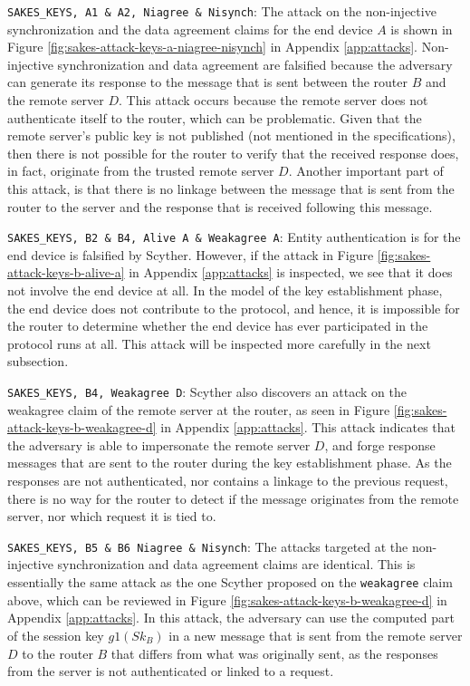 \begin{list}{•}{}


\item \texttt{SAKES\_KEYS, A1 \& A2, Niagree \& Nisynch}: The attack on the non-injective synchronization and the data agreement claims for the end device $A$ is shown in Figure \ref{fig:sakes-attack-keys-a-niagree-nisynch} in Appendix \ref{app:attacks}. Non-injective synchronization and data agreement are falsified because the adversary can generate its response to the message that is sent between the router $B$ and the remote server $D$. This attack occurs because the remote server does not authenticate itself to the router, which can be problematic. Given that the remote server's public key is not published (not mentioned in the specifications), then there is not possible for the router to verify that the received response does, in fact, originate from the trusted remote server $D$. Another important part of this attack, is that there is no linkage between the message that is sent from the router to the server and the response that is received following this message. 

\item \texttt{SAKES\_KEYS, B2 \& B4, Alive A \& Weakagree A}: Entity authentication is for the end device is falsified by Scyther. However, if the attack in Figure \ref{fig:sakes-attack-keys-b-alive-a} in Appendix \ref{app:attacks} is inspected, we see that it does not involve the end device at all. In the model of the key establishment phase, the end device does not contribute to the protocol, and hence, it is impossible for the router to determine whether the end device has ever participated in the protocol runs at all. This attack will be inspected more carefully in the next subsection.

\item \texttt{SAKES\_KEYS, B4, Weakagree D}: Scyther also discovers an attack on the weakagree claim of the remote server at the router, as seen in Figure \ref{fig:sakes-attack-keys-b-weakagree-d} in Appendix \ref{app:attacks}. This attack indicates that the adversary is able to impersonate the remote server $D$, and forge response messages that are sent to the router during the key establishment phase. As the responses are not authenticated, nor contains a linkage to the previous request, there is no way for the router to detect if the message originates from the remote server, nor which request it is tied to.

\item \texttt{SAKES\_KEYS, B5 \& B6 Niagree \& Nisynch}: The attacks targeted at the non-injective synchronization and data agreement claims are identical.  This is essentially the same attack as the one Scyther proposed on the \texttt{weakagree} claim above, which can be reviewed in Figure \ref{fig:sakes-attack-keys-b-weakagree-d} in Appendix \ref{app:attacks}. In this attack, the adversary can use the computed part of the session key $g1(Sk_B)$ in a new message that is sent from the remote server $D$ to the router $B$ that differs from what was originally sent, as the responses from the server is not authenticated or linked to a request.

\end{list}


